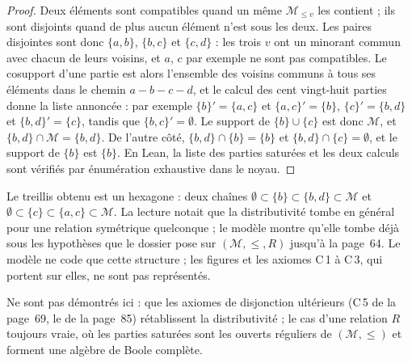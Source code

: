 \begin{proof}
Deux éléments sont compatibles quand un même $\mathcal M_{\leq v}$ les contient ; ils sont disjoints quand de plus aucun élément n'est sous les deux. Les paires disjointes sont donc $\{a, b\}$, $\{b, c\}$ et $\{c, d\}$ : les trois $v$ ont un minorant commun avec chacun de leurs voisins, et $a$, $c$ par exemple ne sont pas compatibles. Le cosupport d'une partie est alors l'ensemble des voisins communs à tous ses éléments dans le chemin $a - b - c - d$, et le calcul des cent vingt-huit parties donne la liste annoncée : par exemple $\{b\}' = \{a, c\}$ et $\{a, c\}' = \{b\}$, $\{c\}' = \{b, d\}$ et $\{b, d\}' = \{c\}$, tandis que $\{b, c\}' = \emptyset$. Le support de $\{b\} \cup \{c\}$ est donc $\mathcal M$, et $\{b, d\} \cap \mathcal M = \{b, d\}$. De l'autre côté, $\{b, d\} \cap \{b\} = \{b\}$ et $\{b, d\} \cap \{c\} = \emptyset$, et le support de $\{b\}$ est $\{b\}$. En Lean, la liste des parties saturées et les deux calculs sont vérifiés par énumération exhaustive dans le noyau.
\end{proof}

\begin{remarque}
Le treillis obtenu est un hexagone : deux chaînes $\emptyset \subset \{b\} \subset \{b, d\} \subset \mathcal M$ et $\emptyset \subset \{c\} \subset \{a, c\} \subset \mathcal M$. La lecture notait que la distributivité tombe en général pour une relation symétrique quelconque ; le modèle montre qu'elle tombe déjà sous les hypothèses que le dossier pose sur $(\mathcal M, \leq, R)$ jusqu'à la page~64. Le modèle ne code que cette structure ; les figures et les axiomes C\,1 à C\,3, qui portent sur elles, ne sont pas représentés.
\end{remarque}

Ne sont pas démontrés ici : que les axiomes de disjonction ultérieurs (C\,5 de la page~69, le  de la page~85) rétablissent la distributivité ; le cas d'une relation $R$ toujours vraie, où les parties saturées sont les ouverts réguliers de $(\mathcal M, \leq)$ et forment une algèbre de Boole complète.
